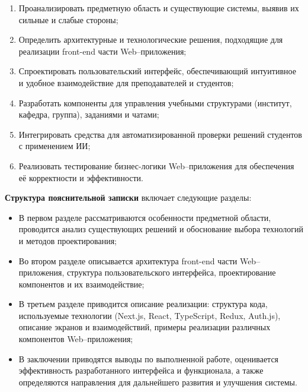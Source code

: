 \begin{enumerate}
  \item Проанализировать предметную область и существующие системы, выявив их сильные и слабые стороны;
  \item Определить архитектурные и технологические решения, подходящие для реализации front-end части Web–приложения;
  \item Спроектировать пользовательский интерфейс, обеспечивающий интуитивное и удобное взаимодействие для преподавателей и студентов;
  \item Разработать компоненты для управления учебными структурами (институт, кафедра, группа), заданиями и чатами;
  \item Интегрировать средства для автоматизированной проверки решений студентов с применением ИИ;
  \item Реализовать тестирование бизнес-логики Web–приложения для обеспечения её корректности и эффективности.
\end{enumerate}

\textbf{Структура пояснительной записки} включает следующие разделы:
\begin{itemize}
  \item В первом разделе рассматриваются особенности предметной области, проводится анализ существующих решений и обоснование выбора технологий и методов проектирования;
  \item Во втором разделе описывается архитектура front-end части Web–приложения, структура пользовательского интерфейса, проектирование компонентов и их взаимодействие;
  \item В третьем разделе приводится описание реализации: структура кода, используемые технологии (Next.js, React, TypeScript, Redux, Auth.js), описание экранов и взаимодействий, примеры реализации различных компонентов Web–приложения;
  \item В заключении приводятся выводы по выполненной работе, оценивается эффективность разработанного интерфейса и функционала, а также определяются направления для дальнейшего развития и улучшения системы.
\end{itemize}
